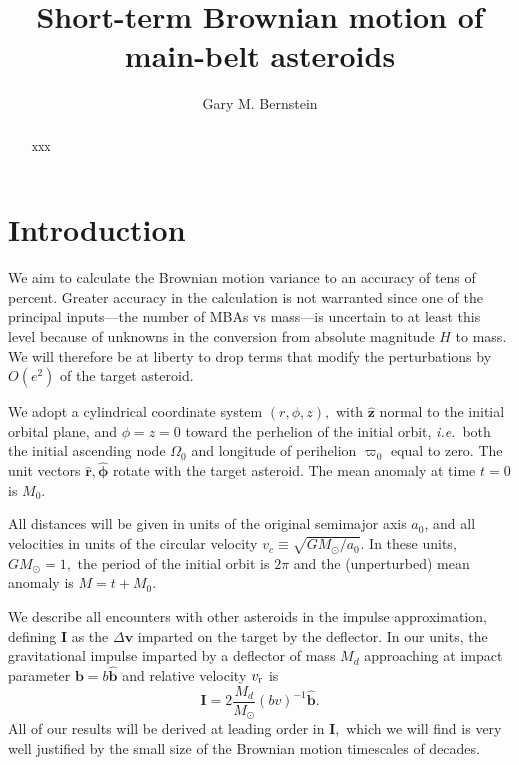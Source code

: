 \documentclass[linenumbers, onecolumn]{aastex631}
\newcommand{\ie}{\textit{i.e.\/}}
\newcommand{\vecI}{\mathbf{I}}
\newcommand{\vecb}{\mathbf{b}}
\newcommand{\bhat}{\mathbf{\hat b}}
\newcommand{\rhat}{\mathbf{\hat r}}
\newcommand{\phat}{\boldsymbol{\hat\phi}}
\newcommand{\zhat}{\mathbf{\hat z}}
\newcommand{\vecv}{\mathbf{v}}
\newcommand{\vcirc}{v_c}
\newcommand{\vrel}{v_{\rm r}}
\newcommand{\Msun}{M_\odot}
\newcommand{\lop}{\varpi}
\begin{document}
\title{Short-term Brownian motion of main-belt asteroids} 

\author[0000-0002-8613-8259]{Gary M. Bernstein}


\begin{abstract}
  xxx
\end{abstract}


\section{Introduction}

We aim to calculate the Brownian motion variance to an accuracy of tens of percent.  Greater accuracy in the calculation is not warranted since one of the principal inputs---the number of MBAs vs mass---is uncertain to at least this level because of unknowns in the conversion from absolute magnitude $H$ to mass.  We will therefore be at liberty to drop terms that modify the perturbations by $O(e^2)$ of the target asteroid.  

We adopt a cylindrical coordinate system $(r,\phi,z),$ with $\zhat$
normal to the initial orbital plane, and $\phi=z=0$ toward the
perhelion of the initial orbit, \ie\ both the initial ascending node
$\Omega_0$ and longitude of perihelion $\lop_0$ equal to zero.  The
unit vectors $\rhat, \phat$ rotate with the target asteroid.  The mean
anomaly at time $t=0$ is $M_0.$

All distances will be given in units of the original semimajor axis $a_0$, and all velocities in units of the circular velocity $\vcirc \equiv \sqrt{G\Msun/a_0}.$  In these units, $G\Msun=1,$ the period of the initial orbit is $2\pi$ and the (unperturbed) mean anomaly is $M=t+M_0.$ 

We describe all encounters with other asteroids in the impulse approximation, defining $\vecI$ as the $\Delta\vecv$ imparted on the target by the deflector.
In our units, the gravitational impulse imparted by a deflector of mass $M_d$ approaching at impact parameter $\vecb=b\bhat$ and relative velocity $\vrel$ is
\begin{equation}
  \vecI = 2 \frac{M_d}{\Msun} (bv)^{-1} \bhat.
  \label{eq:impulse}
\end{equation}
All of our results will be derived at leading order in $\vecI,$ which we will find is very well justified by the small size of the Brownian motion timescales of decades.
\end{document}
